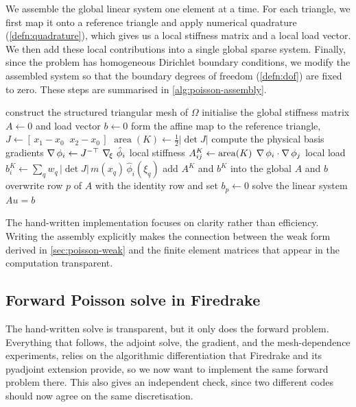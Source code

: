 \documentclass[a4paper,11pt]{article}
\newcommand{\Om}{\Omega}
\theoremstyle{spacedplain} \newtheorem{theorem}[counter]{Theorem} \newtheorem{lemma}[counter]{Lemma} \newtheorem{prop}[counter]{Proposition} \newtheorem{cor}[counter]{Corollary}
\theoremstyle{spaceddefinition} \newtheorem{defn}[counter]{Definition} \newtheorem{example}[counter]{Example} \newtheorem{remark}[counter]{Remark}
\begin{document}
We assemble the global linear system one element at a time. For each triangle, we first map it onto a reference triangle and apply numerical quadrature (\cref{defn:quadrature}), which gives us a local stiffness matrix and a local load vector. We then add these local contributions into a single global sparse system. Finally, since the problem has homogeneous Dirichlet boundary conditions, we modify the assembled system so that the boundary degrees of freedom (\cref{defn:dof}) are fixed to zero. These steps are summarised in \cref{alg:poisson-assembly}.

\begin{algorithm}[H]
\caption{Assembly and solution of the $P_1$ forward Poisson system, as carried out by hand.}
\label{alg:poisson-assembly}
\begin{algorithmic}[1]
\State construct the structured triangular mesh of $\Om$
\State initialise the global stiffness matrix $A \gets 0$ and load vector $b \gets 0$
  \State form the affine map to the reference triangle, $J \gets [\,x_1 - x_0 \;\; x_2 - x_0\,]$
  \State $\operatorname{area}(K) \gets \tfrac{1}{2}\lvert\det J\rvert$
  \State compute the physical basis gradients $\operatorname{\nabla} \phi_i \gets J^{-\top}\, \operatorname{\nabla}_{\!\xi}\, \hat{\phi}_i$
  \State local stiffness $A^K_{ij} \gets \operatorname{area}(K)\; \operatorname{\nabla} \phi_i \cdot \operatorname{\nabla} \phi_j$
  \State local load $b^K_i \gets \sum_q w_q\, \lvert\det J\rvert\, m(x_q)\, \hat{\phi}_i(\xi_q)$ 
  \State add $A^K$ and $b^K$ into the global $A$ and $b$
\EndFor
{} 
  \State overwrite row $p$ of $A$ with the identity row and set $b_p \gets 0$
\EndFor
\State solve the linear system $A u = b$
\end{algorithmic}
\end{algorithm}

The hand-written implementation focuses on clarity rather than efficiency. Writing the assembly explicitly makes the connection between the weak form derived in \cref{sec:poisson-weak} and the finite element matrices that appear in the computation transparent.

\subsection{Forward Poisson solve in Firedrake}
\label{sec:poisson-numerics:firedrake}

The hand-written solve is transparent, but it only does the forward problem. Everything that follows, the adjoint solve, the gradient, and the mesh-dependence experiments, relies on the algorithmic differentiation that Firedrake and its pyadjoint extension provide, so we now want to implement the same forward problem there. This also gives an independent check, since two different codes should now agree on the same discretisation.
\end{document}
